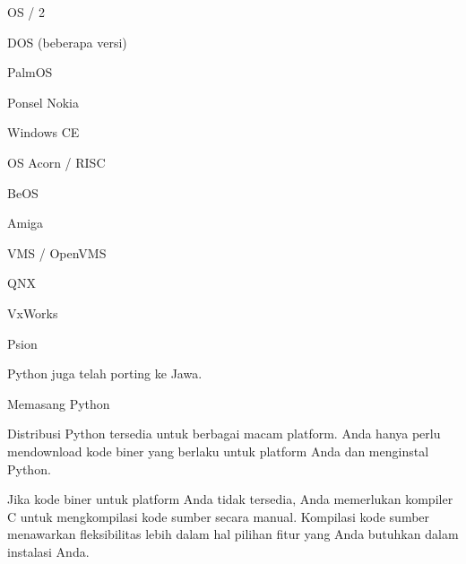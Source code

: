 \documentclass[a4paper,12pt]{report}
\begin{document}
\noindent 
{\fontsize{14pt}{14pt}\selectfont OS / 2 \\} \par
\noindent 
{\fontsize{14pt}{14pt}\selectfont DOS (beberapa versi) \\} \par
\noindent 
{\fontsize{14pt}{14pt}\selectfont PalmOS \\} \par
\noindent 
{\fontsize{14pt}{14pt}\selectfont Ponsel Nokia \\} \par
\noindent 
{\fontsize{14pt}{14pt}\selectfont Windows CE \\} \par
\noindent 
{\fontsize{14pt}{14pt}\selectfont OS Acorn / RISC \\} \par
\noindent 
{\fontsize{14pt}{14pt}\selectfont BeOS \\} \par
\noindent 
{\fontsize{14pt}{14pt}\selectfont Amiga \\} \par
\noindent 
{\fontsize{14pt}{14pt}\selectfont VMS / OpenVMS \\} \par
\noindent 
{\fontsize{14pt}{14pt}\selectfont QNX \\} \par
\noindent 
{\fontsize{14pt}{14pt}\selectfont VxWorks \\} \par
\noindent 
{\fontsize{14pt}{14pt}\selectfont Psion \\} \par
\noindent 
{\fontsize{14pt}{14pt}\selectfont Python juga telah porting ke Jawa. \\} \par
\noindent 
{\fontsize{14pt}{14pt}\selectfont Memasang Python \\} \par
\noindent 
{\fontsize{14pt}{14pt}\selectfont Distribusi Python tersedia untuk berbagai macam platform. Anda hanya perlu mendownload kode biner yang berlaku untuk platform Anda dan menginstal Python. \\} \par
\vspace{14pt}
\noindent 
{\fontsize{14pt}{14pt}\selectfont Jika kode biner untuk platform Anda tidak tersedia, Anda memerlukan kompiler C untuk mengkompilasi kode sumber secara manual. Kompilasi kode sumber menawarkan fleksibilitas lebih dalam hal pilihan fitur yang Anda butuhkan dalam instalasi Anda. \\} \par
\end{document}
